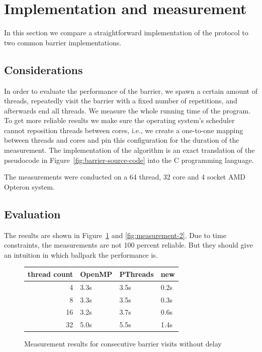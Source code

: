 \documentclass[a4paper, 10pt]{article}
\begin{document}
\clearpage

\section{Implementation and measurement}
In this section we compare a straightforward implementation of the protocol to two common barrier implementations.
\subsection{Considerations}
In order to evaluate the performance of the barrier, we spawn a certain amount of threads, repeatedly visit the barrier with a fixed number of repetitions, and afterwards end all threads. We measure the whole running time of the program. To get more reliable results we make sure the operating system's scheduler cannot reposition threads between cores, i.e., we create a one-to-one mapping between threads and cores and pin this configuration for the duration of the measurement. The implementation of the algorithm is an exact translation of the pseudocode in Figure~\ref{fig:barrier-source-code} into the C programming language.

The measurements were conducted on a 64 thread, 32 core and 4 socket AMD Opteron system.
\subsection{Evaluation}
The results are shown in Figure~\ref{fig:measurement-1} and \ref{fig:measurement-2}. Due to time constraints, the measurements are not 100 percent reliable. But they should give an intuition in which ballpark the performance is.
\begin{figure}[htbp]
	\centering
	\begin{tabular}{r | l l l }
		thread count & OpenMP  & PThreads  & new \\
		\hline
		 4           & 3.3s    & 3.5s      & 0.2s \\
		 8           & 3.3s    & 3.5s      & 0.3s \\
		16           & 3.2s    & 3.7s      & 0.6s \\
		32           & 5.0s    & 5.5s      & 1.4s \\
	\end{tabular}
	\caption{Measurement results for consecutive barrier visits without delay}
	\label{fig:measurement-1}
\end{figure}
\end{document}
